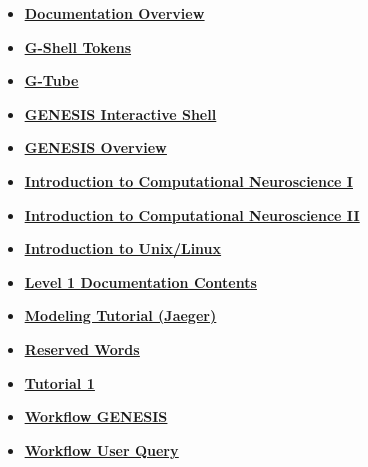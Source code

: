 \documentclass[12pt]{article}
\begin{document}
\begin{itemize}
\item \href{../documentation-overview/documentation-overview.pdf}{\bf \underline{Documentation Overview}}

\item \href{../shell-tokens/shell-tokens.pdf}{\bf \underline{G-Shell Tokens}}

\item \href{../gtube/gtube.pdf}{\bf \underline{G-Tube}}

\item \href{../gshell/gshell.pdf}{\bf \underline{GENESIS Interactive Shell}}

\item \href{../genesis-overview/genesis-overview.pdf}{\bf \underline{GENESIS Overview}}

\item \href{../compneurosci-1/compneurosci-1.pdf}{\bf \underline{Introduction to Computational Neuroscience I}}

\item \href{../compneurosci-2/compneurosci-2.pdf}{\bf \underline{Introduction to Computational Neuroscience II}}

\item \href{../unix-linux/unix-linux.pdf}{\bf \underline{Introduction to Unix/Linux}}

\item \href{../contents-level1/contents-level1.pdf}{\bf \underline{Level 1 Documentation Contents}}

\item \href{../tutorial-jaeger/tutorial-jaeger.pdf}{\bf \underline{Modeling Tutorial (Jaeger)}}

\item \href{../reserved-words/reserved-words.pdf}{\bf \underline{Reserved Words}}

\item \href{../tutorial1/tutorial1.pdf}{\bf \underline{Tutorial 1}}

\item \href{../workflow-genesis/workflow-genesis.pdf}{\bf \underline{Workflow GENESIS}}

\item \href{../workflow-user-query/workflow-user-query.pdf}{\bf \underline{Workflow User Query}}


\end{itemize}

\end{document}
